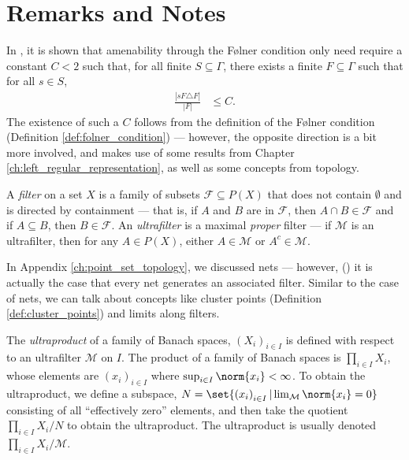 \section{Remarks and Notes}%
In \cite[Appendix A.3]{juschenko_amenability}, it is shown that amenability through the Følner condition only need require a constant $C < 2$ such that, for all finite $S\subseteq \Gamma$, there exists a finite $F\subseteq \Gamma$ such that for all $s\in S$,
\begin{align*}
  \frac{\left\vert sF\triangle F \right\vert}{\left\vert F \right\vert} &\leq C.
\end{align*}
The existence of such a $C$ follows from the definition of the Følner condition (Definition \ref{def:folner_condition}) --- however, the opposite direction is a bit more involved, and makes use of some results from Chapter \ref{ch:left_regular_representation}, as well as some concepts from topology.\newline

A \textit{filter} on a set $X$ is a family of subsets $\mathcal{F}\subseteq P(X)$ that does not contain $\emptyset$ and is directed by containment --- that is, if $A$ and $B$ are in $\mathcal{F}$, then $A\cap B\in \mathcal{F}$ and if $A\subseteq B$, then $B\in \mathcal{F}$. An \textit{ultrafilter} is a maximal \textit{proper} filter --- if $\mathcal{M}$ is an ultrafilter, then for any $A\in P(X)$, either $A\in \mathcal{M}$ or $A^{c}\in \mathcal{M}$.\newline

In Appendix \ref{ch:point_set_topology}, we discussed nets --- however, (\cite[Theorem 2.25]{aliprantis_infinite_dimensional_analysis}) it is actually the case that every net generates an associated filter. Similar to the case of nets, we can talk about concepts like cluster points (Definition \ref{def:cluster_points}) and limits along filters.\newline

The \textit{ultraproduct} of a family of Banach spaces, $\left( X_i \right)_{i\in I}$ is defined with respect to an ultrafilter $\mathcal{M}$ on $I$. The product of a family of Banach spaces is $\prod_{i\in I}X_i$, whose elements are $\left( x_i \right)_{i\in I}$ where $\sup_{i\in I}\norm{x_i} < \infty$. To obtain the ultraproduct, we define a subspace, $N = \set{\left( x_i \right)_{i\in I} | \lim_{\mathcal{M}}\norm{x_i} = 0}$ consisting of all ``effectively zero'' elements, and then take the quotient $\prod_{i\in I}X_i/N$ to obtain the ultraproduct. The ultraproduct is usually denoted $\prod_{i\in I}X_i/\mathcal{M}$.\newline

